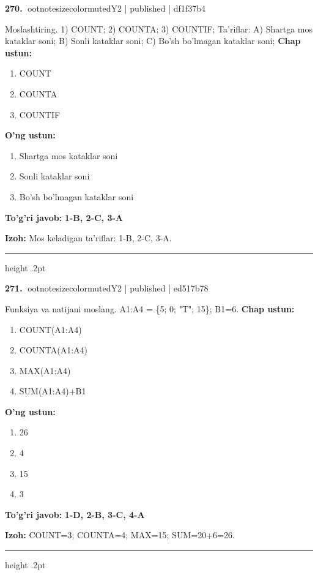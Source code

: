 \documentclass[10pt,a4paper]{article}
\begin{document}
\textbf{\color{ink}270.} {ootnotesizecolor{muted}Y2 | published | df1f37b4}
\par
Moslashtiring.  1) COUNT;  2) COUNTA;  3) COUNTIF;  Ta'riflar: A) Shartga mos kataklar soni;  B) Sonli kataklar soni;  C) Bo'sh bo'lmagan kataklar soni;
\textbf{Chap ustun:}\begin{enumerate}[label=\arabic*),leftmargin=9mm]
\item COUNT
\item COUNTA
\item COUNTIF
\end{enumerate}
\textbf{O'ng ustun:}\begin{enumerate}[label=\Alph*),leftmargin=9mm]
\item Shartga mos kataklar soni
\item Sonli kataklar soni
\item Bo'sh bo'lmagan kataklar soni
\end{enumerate}
\begin{tcolorbox}[enhanced,breakable,colback=teal!4,colframe=teal!55!black,boxrule=0.45pt,arc=1.2mm,left=2.8mm,right=2.8mm,top=2mm,bottom=2mm]
\textbf{\color{teal}To'g'ri javob:} \textbf{1-B, 2-C, 3-A}
\par\smallskip
\textbf{Izoh:} Mos keladigan ta'riflar: 1-B, 2-C, 3-A.
\end{tcolorbox}
\vspace{2mm}\hrule height .2pt\vspace{2mm}

\textbf{\color{ink}271.} {ootnotesizecolor{muted}Y2 | published | ed517b78}
\par
Funksiya va natijani moslang. A1:A4 = \{5; 0; "T"; 15\}; B1=6.
\textbf{Chap ustun:}\begin{enumerate}[label=\arabic*),leftmargin=9mm]
\item COUNT(A1:A4)
\item COUNTA(A1:A4)
\item MAX(A1:A4)
\item SUM(A1:A4)+B1
\end{enumerate}
\textbf{O'ng ustun:}\begin{enumerate}[label=\Alph*),leftmargin=9mm]
\item 26
\item 4
\item 15
\item 3
\end{enumerate}
\begin{tcolorbox}[enhanced,breakable,colback=teal!4,colframe=teal!55!black,boxrule=0.45pt,arc=1.2mm,left=2.8mm,right=2.8mm,top=2mm,bottom=2mm]
\textbf{\color{teal}To'g'ri javob:} \textbf{1-D, 2-B, 3-C, 4-A}
\par\smallskip
\textbf{Izoh:} COUNT=3; COUNTA=4; MAX=15; SUM=20+6=26.
\end{tcolorbox}
\vspace{2mm}\hrule height .2pt\vspace{2mm}
\end{document}
